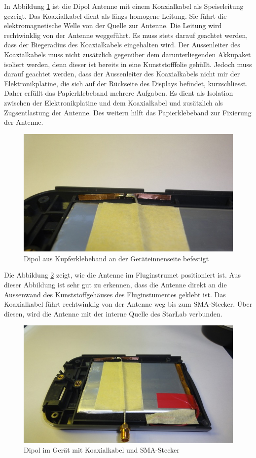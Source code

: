 \newpage
In Abbildung \ref{fig:DipolausKupferbandGeraeteinnenseite} ist  die Dipol Antenne mit einem Koaxialkabel als Speiseleitung gezeigt. Das Koaxialkabel dient als längs homogene Leitung. Sie führt die elektromagnetische Welle von der Quelle zur Antenne. Die Leitung wird rechtwinklig von der Antenne weggeführt. Es muss stets darauf geachtet werden, dass der Biegeradius des Koaxialkabels eingehalten wird. Der Aussenleiter des Koaxialkabels muss nicht zusätzlich gegenüber dem darunterliegenden Akkupaket isoliert werden, denn dieser ist bereits in eine Kunststofffolie gehüllt. Jedoch muss darauf geachtet werden, dass der Aussenleiter des Koaxialkabels nicht mir der Elektronikplatine, die sich auf der Rückseite des Displays befindet, kurzschliesst. Daher erfüllt das Papierklebeband mehrere Aufgaben. Es dient als Isolation zwischen der Elektronikplatine und dem Koaxialkabel und zusätzlich als Zugsentlastung der Antenne. Des weitern hilft das Papierklebeband zur Fixierung der Antenne.\\
\begin{figure}[!ht]
	\centering
	\includegraphics[width=15cm]{content/bilder/Implementierung/DipolIMGeraet.jpg}%
	\caption{Dipol aus Kupferklebeband an der Geräteinnenseite befestigt}
	\label{fig:DipolausKupferbandGeraeteinnenseite}
\end{figure}
\clearpage
\newpage
Die Abbildung \ref{fig:DipolimGeraet} zeigt, wie die Antenne im Fluginstrumet positioniert ist. Aus dieser Abbildung ist sehr gut zu erkennen, dass die Antenne direkt an die Aussenwand des Kunststoffgehäuses  des Fluginstumentes geklebt ist. Das Koaxialkabel führt rechtwinklig von der Antenne weg bis zum SMA-Stecker. Über diesen, wird die Antenne mit der interne Quelle des StarLab verbunden.\\
\begin{figure}[!ht]
	\centering
	\includegraphics[width=15cm]{content/bilder/Implementierung/DipolKabelGeraet.jpg}%
	\caption{Dipol im Gerät mit Koaxialkabel und SMA-Stecker}
	\label{fig:DipolimGeraet}
\end{figure}






